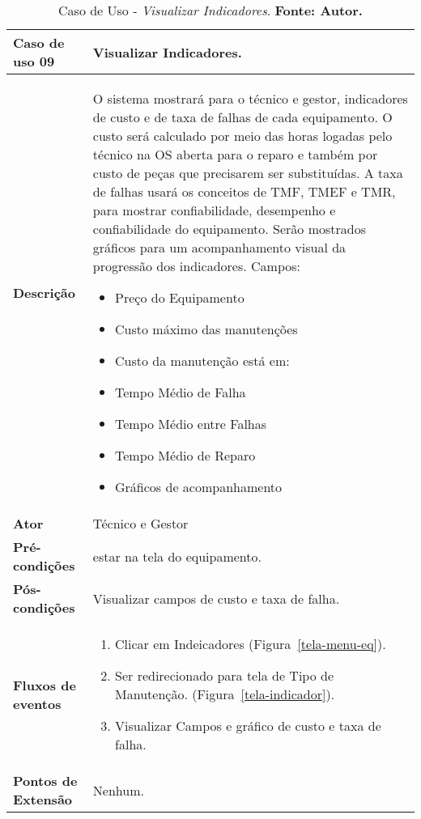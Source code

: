 \begin{apendicesenv}
\begin{table}[H]
\centering
\caption{Caso de Uso - \textit{Visualizar Indicadores}. \textbf{Fonte: Autor.}}
\label{uc09}
\begin{tabular}{ | p{5cm} | p{10cm} |  }
\hline
	\textbf{Caso de uso 09} & Visualizar Indicadores. \\ \hline
	\textbf{Descrição} & O sistema mostrará para o técnico e gestor, indicadores de custo e de taxa de falhas de cada equipamento. O custo será calculado por meio das horas logadas pelo técnico na OS aberta para o reparo e também por custo de peças que precisarem ser substituídas. A taxa de falhas usará os conceitos de TMF, TMEF e TMR, para mostrar confiabilidade, desempenho e confiabilidade do equipamento. Serão mostrados gráficos para um acompanhamento visual da progressão dos indicadores. Campos: \begin{itemize}
															                    \item Preço do Equipamento
															                    \item Custo máximo das manutenções
															                    \item Custo da manutenção está em:
															                    \item Tempo Médio de Falha 
															                    \item Tempo Médio entre Falhas
															                    \item Tempo Médio de Reparo
															                    \item Gráficos de acompanhamento
															                    \end{itemize} \\ \hline
	\textbf{Ator} & Técnico e Gestor \\ \hline
	\textbf{Pré-condições} & estar na tela do equipamento. \\ \hline
	\textbf{Pós-condições} & Visualizar campos de custo e taxa de falha. \\ \hline
	\textbf{Fluxos de eventos} & \begin{enumerate}
									\item Clicar em Indeicadores (Figura~\ref{tela-menu-eq}).    								
									\item Ser redirecionado para tela de Tipo de Manutenção. (Figura~\ref{tela-indicador}).
									\item Visualizar Campos e gráfico de custo e taxa de falha.
								 \end{enumerate}   \\ \hline
	\textbf{Pontos de Extensão} & Nenhum. \\ \hline
\end{tabular}
\end{table}


\end{apendicesenv}
